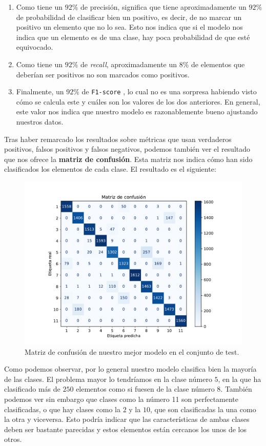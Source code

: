 \documentclass[a4paper, 20pt]{article}
\begin{document}
\begin{enumerate}
\item Como tiene un $92\%$ de precisión, significa que tiene aproximadamente un $92\%$ de probabilidad de clasificar bien un positivo, es decir, de no marcar un positivo un elemento que no lo sea. Esto nos indica que si el modelo nos indica que un elemento es de una clase, hay poca probabilidad de que esté equivocado.

\item Como tiene un $92\%$ de \emph{recall}, aproximadamente un $8\%$ de elementos que deberían ser positivos no son marcados como positivos.

  \item Finalmente, un $92\%$ de \lstinline{F1-score} , lo cual no es una sorpresa habiendo visto cómo se calcula este y cuáles son los valores de los dos anteriores. En general, este valor nos indica que nuestro modelo es razonablemente bueno ajustando nuestros datos.
\end{enumerate}

Tras haber remarcado los resultados sobre métricas que usan verdaderos positivos, falsos positivos y falsos negativos, podemos también ver el resultado que nos ofrece la \textbf{matriz de confusión}. Esta matriz nos indica cómo han sido clasificados los elementos de cada clase. El resultado es el siguiente:

\begin{figure}[H]
  \centering
  \includegraphics[width=0.60\linewidth]{media/confusion.pdf}
  \caption{Matriz de confusión de nuestro mejor modelo en el conjunto de test. }
  \label{fig:confusion}
\end{figure}

Como podemos observar, por lo general nuestro modelo clasifica bien la mayoría de las clases. El problema mayor lo tendríamos en la clase número $5$, en la que ha clasificado más de $250$ elementos como si fuesen de la clase número $8$. También podemos ver sin embargo que clases como la número 11 son perfectamente clasificadas, o que hay clases como la $2$ y la $10$, que son clasificadas la una como la otra y viceversa. Esto podría indicar que las características de ambas clases deben ser bastante parecidas y estos elementos están cercanos los unos de los otros.
\end{document}
